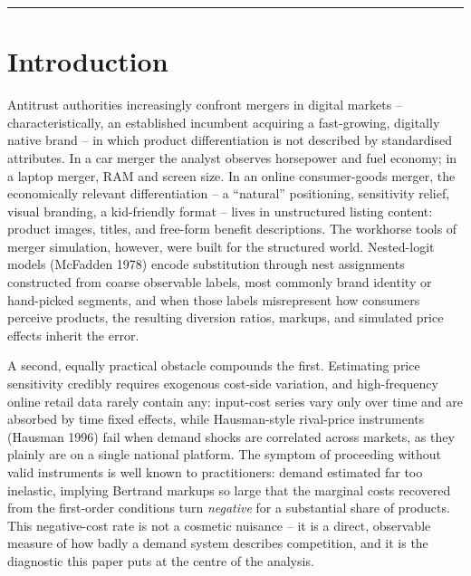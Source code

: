 


\begin{center}\rule{0.5\linewidth}{0.5pt}\end{center}

\chapter{Introduction}\label{introduction}

Antitrust authorities increasingly confront mergers in digital markets
-- characteristically, an established incumbent acquiring a
fast-growing, digitally native brand -- in which product differentiation
is not described by standardised attributes. In a car merger the analyst
observes horsepower and fuel economy; in a laptop merger, RAM and screen
size. In an online consumer-goods merger, the economically relevant
differentiation -- a ``natural'' positioning, sensitivity relief, visual
branding, a kid-friendly format -- lives in unstructured listing
content: product images, titles, and free-form benefit descriptions. The
workhorse tools of merger simulation, however, were built for the
structured world. Nested-logit models (McFadden 1978) encode
substitution through nest assignments constructed from coarse observable
labels, most commonly brand identity or hand-picked segments, and when
those labels misrepresent how consumers perceive products, the resulting
diversion ratios, markups, and simulated price effects inherit the
error.

A second, equally practical obstacle compounds the first. Estimating
price sensitivity credibly requires exogenous cost-side variation, and
high-frequency online retail data rarely contain any: input-cost series
vary only over time and are absorbed by time fixed effects, while
Hausman-style rival-price instruments (Hausman 1996) fail when demand
shocks are correlated across markets, as they plainly are on a single
national platform. The symptom of proceeding without valid instruments
is well known to practitioners: demand estimated far too inelastic,
implying Bertrand markups so large that the marginal costs recovered
from the first-order conditions turn \emph{negative} for a substantial
share of products. This negative-cost rate is not a cosmetic nuisance --
it is a direct, observable measure of how badly a demand system
describes competition, and it is the diagnostic this paper puts at the
centre of the analysis.

